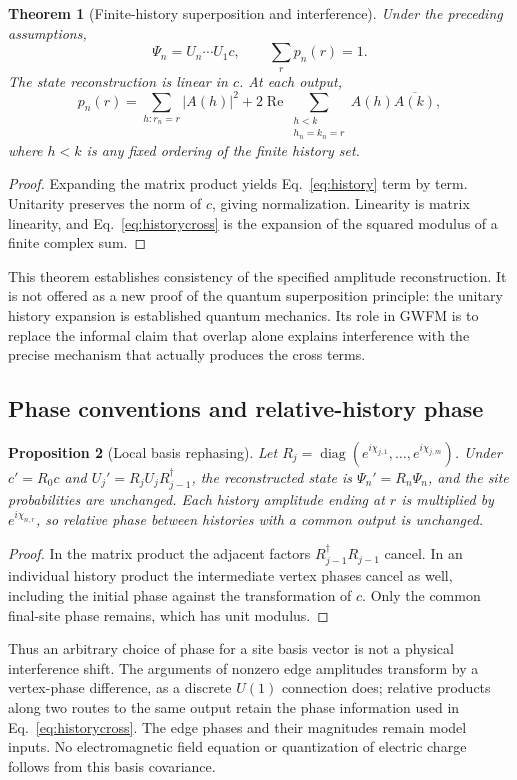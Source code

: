 \documentclass[aip,jmp,reprint,onecolumn,amsmath,amssymb]{revtex4-2}
\newtheorem{theorem}{Theorem}[section]
\newtheorem{proposition}[theorem]{Proposition}
\theoremstyle{definition}
\begin{document}
\begin{theorem}[Finite-history superposition and interference]
Under the preceding assumptions,
\begin{equation}
 \Psi_n=U_n\cdots U_1c,\qquad\sum_r p_n(r)=1.
 \label{eq:unitaryhistory}
\end{equation}
The state reconstruction is linear in $c$. At each output,
\begin{equation}
 p_n(r)=\sum_{h:r_n=r}|A(h)|^2
 +2\operatorname{Re}\sum_{\substack{h<k\\h_n=k_n=r}}A(h)\overline{A(k)},
 \label{eq:historycross}
\end{equation}
where $h<k$ is any fixed ordering of the finite history set.
\end{theorem}
\begin{proof}
Expanding the matrix product yields Eq.~\eqref{eq:history} term by term. Unitarity preserves the norm of $c$, giving normalization. Linearity is matrix linearity, and Eq.~\eqref{eq:historycross} is the expansion of the squared modulus of a finite complex sum.
\end{proof}
This theorem establishes consistency of the specified amplitude reconstruction. It is not offered as a new proof of the quantum superposition principle: the unitary history expansion is established quantum mechanics.\cite{feynmanpath,aharonov,kempe} Its role in GWFM is to replace the informal claim that overlap alone explains interference with the precise mechanism that actually produces the cross terms.

\subsection{Phase conventions and relative-history phase}
\begin{proposition}[Local basis rephasing]
Let $R_j=\operatorname{diag}(e^{i\chi_{j,1}},\ldots,e^{i\chi_{j,m}})$. Under $c'=R_0c$ and $U_j'=R_jU_jR_{j-1}^\dagger$, the reconstructed state is $\Psi_n'=R_n\Psi_n$, and the site probabilities are unchanged. Each history amplitude ending at $r$ is multiplied by $e^{i\chi_{n,r}}$, so relative phase between histories with a common output is unchanged.
\end{proposition}
\begin{proof}
In the matrix product the adjacent factors $R_{j-1}^\dagger R_{j-1}$ cancel. In an individual history product the intermediate vertex phases cancel as well, including the initial phase against the transformation of $c$. Only the common final-site phase remains, which has unit modulus.
\end{proof}
Thus an arbitrary choice of phase for a site basis vector is not a physical interference shift. The arguments of nonzero edge amplitudes transform by a vertex-phase difference, as a discrete $U(1)$ connection does; relative products along two routes to the same output retain the phase information used in Eq.~\eqref{eq:historycross}. The edge phases and their magnitudes remain model inputs. No electromagnetic field equation or quantization of electric charge follows from this basis covariance.
\end{document}
